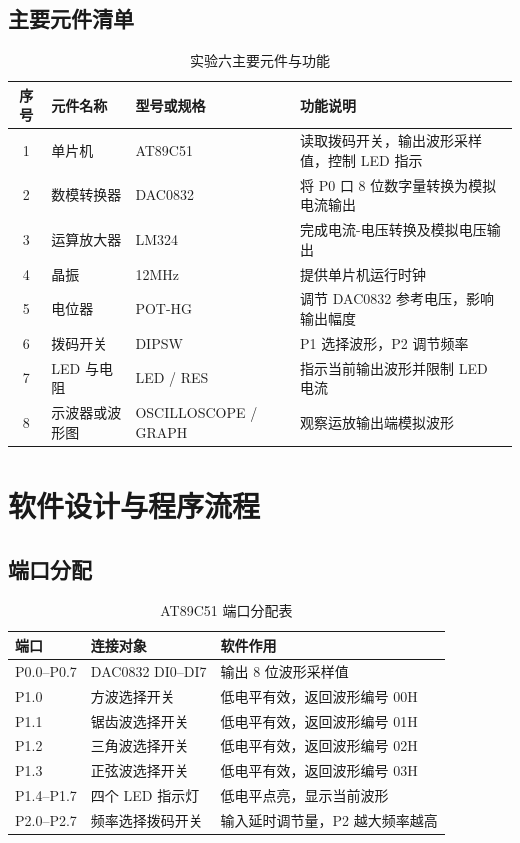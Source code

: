 \subsection{主要元件清单}
\begin{table}[H]
  \centering
  \caption{实验六主要元件与功能}
  \small
  \renewcommand{\arraystretch}{1.3}
  \begin{tabular}{cp{}p{}p{}}
    \toprule
    序号 & 元件名称 & 型号或规格 & 功能说明 \\
    \midrule
    1 & 单片机 & AT89C51 & 读取拨码开关，输出波形采样值，控制 LED 指示 \\
    2 & 数模转换器 & DAC0832 & 将 P0 口 8 位数字量转换为模拟电流输出 \\
    3 & 运算放大器 & LM324 & 完成电流-电压转换及模拟电压输出 \\
    4 & 晶振 & 12MHz & 提供单片机运行时钟 \\
    5 & 电位器 & POT-HG & 调节 DAC0832 参考电压，影响输出幅度 \\
    6 & 拨码开关 & DIPSW & P1 选择波形，P2 调节频率 \\
    7 & LED 与电阻 & LED / RES & 指示当前输出波形并限制 LED 电流 \\
    8 & 示波器或波形图 & OSCILLOSCOPE / GRAPH & 观察运放输出端模拟波形 \\
    \bottomrule
  \end{tabular}
\end{table}

\section{软件设计与程序流程}

\subsection{端口分配}
\begin{table}[H]
  \centering
  \caption{AT89C51 端口分配表}
  \renewcommand{\arraystretch}{1.35}
  \begin{tabular}{p{}p{}p{}}
    \toprule
    端口 & 连接对象 & 软件作用 \\
    \midrule
    P0.0--P0.7 & DAC0832 DI0--DI7 & 输出 8 位波形采样值 \\
    P1.0 & 方波选择开关 & 低电平有效，返回波形编号 00H \\
    P1.1 & 锯齿波选择开关 & 低电平有效，返回波形编号 01H \\
    P1.2 & 三角波选择开关 & 低电平有效，返回波形编号 02H \\
    P1.3 & 正弦波选择开关 & 低电平有效，返回波形编号 03H \\
    P1.4--P1.7 & 四个 LED 指示灯 & 低电平点亮，显示当前波形 \\
    P2.0--P2.7 & 频率选择拨码开关 & 输入延时调节量，P2 越大频率越高 \\
    \bottomrule
  \end{tabular}
\end{table}


